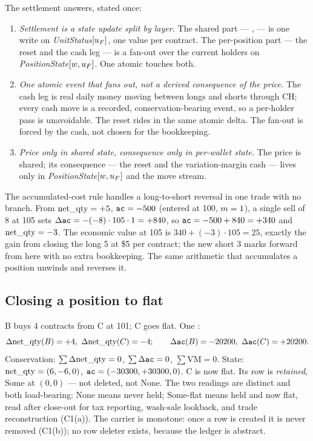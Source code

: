 \noindent The settlement answers, stated once:
\begin{enumerate}
\item \emph{Settlement is a state update split by layer.} The shared part ---
,  --- is one write on
\emph{UnitStatus}$[u_{F}]$, one value per contract. The per-position part --- the \ac{} reset and the
cash leg --- is a fan-out over the current holders on \emph{PositionState}$[w,u_{F}]$. One atomic
 touches both.
\item \emph{One atomic event that fans out, not a derived consequence of the price.} The cash leg is
real daily money moving between longs and shorts through CH; every cash move is a recorded,
conservation-bearing event, so a per-holder pass is unavoidable. The \ac{} reset rides in the same
atomic delta. The fan-out is forced by the cash, not chosen for the bookkeeping.
\item \emph{Price only in shared state, consequence only in per-wallet state.} The price is shared;
its consequence --- the \ac{} reset and the variation-margin cash --- lives only in
\emph{PositionState}$[w,u_{F}]$ and the move stream.
\end{enumerate}

\begin{remark}
The accumulated-cost rule handles a long-to-short reversal in one trade with no branch. From
$\mathrm{net\_qty}=+5$, $\texttt{ac}=-500$ (entered at 100, $m=1$), a single sell of 8 at 105 sets
$\Delta\texttt{ac}=-(-8)\cdot 105\cdot 1=+840$, so $\texttt{ac}=-500+840=+340$ and $\mathrm{net\_qty}=-3$. The economic value at
105 is $340+(-3)\cdot 105 = 25$, exactly the gain from closing the long 5 at \$5 per contract; the new
short 3 marks forward from here with no extra bookkeeping. The same arithmetic that accumulates a
position unwinds and reverses it.
\end{remark}

\subsection{Closing a position to flat}
\label{sec:close}

B buys 4 contracts from C at 101; C goes flat. One :
\[
\Delta\mathrm{net\_qty}(B)=+4,\ \Delta\mathrm{net\_qty}(C)=-4;\qquad \Delta\texttt{ac}(B)=-20200,\ \Delta\texttt{ac}(C)=+20200.
\]
Conservation: $\sum\Delta\mathrm{net\_qty}=0$, $\sum\Delta\texttt{ac}=0$, $\sum\mathrm{VM}=0$. State: $\mathrm{net\_qty}=(6,-6,0)$,
$\texttt{ac}=(-30300,+30300,0)$. C is now flat. Its row is \emph{retained}, $\mathrm{Some}$ at $(0,0)$ --- not
deleted, not $\mathrm{None}$. The two readings are distinct and both load-bearing: $\mathrm{None}$
means never held; $\mathrm{Some}$-flat means held and now flat, read after close-out for tax
reporting, wash-sale lookback, and trade reconstruction (C1(a)). The carrier is monotone: once a row
is created it is never removed (C1(b)); no row deleter exists, because the ledger is abstract.

